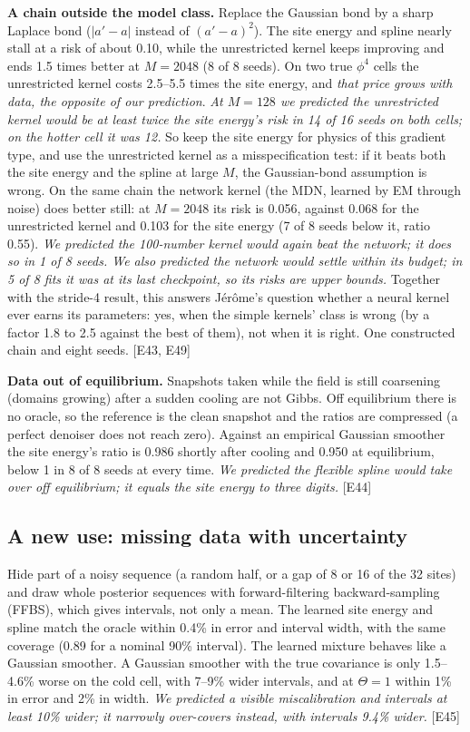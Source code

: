 \documentclass[11pt,a4paper]{article}
\newcommand{\src}[1]{{\footnotesize\color{gray}[#1]}}
\newcommand{\fals}[1]{{\small\itshape #1}}
\begin{document}
\textbf{A chain outside the model class.} Replace the Gaussian bond by a sharp Laplace bond ($|a'-a|$ instead of $(a'-a)^2$). The
site energy and spline nearly stall at a risk of about 0.10, while the unrestricted kernel keeps improving and ends 1.5 times better
at $M=2048$ (8 of 8 seeds). On two true $\phi^4$ cells the unrestricted kernel costs 2.5--5.5 times the site energy, and
\fals{that price grows with data, the opposite of our prediction}. \fals{At $M=128$ we predicted the unrestricted kernel would be at least twice the site energy's risk in 14 of 16 seeds on both cells;
on the hotter cell it was 12.} So keep the site energy for physics of this gradient type, and use the
unrestricted kernel as a misspecification test: if it beats both the site energy and the spline at large $M$, the Gaussian-bond
assumption is wrong. On the same chain the network kernel (the MDN, learned by EM through noise) does better still: at $M=2048$ its risk is
0.056, against 0.068 for the unrestricted kernel and 0.103 for the site energy (7 of 8 seeds below it, ratio 0.55). \fals{We predicted
the 100-number kernel would again beat the network; it does so in 1 of 8 seeds. We also predicted the network would settle within its
budget; in 5 of 8 fits it was at its last checkpoint, so its risks are upper bounds.} Together with the stride-4 result, this answers
Jérôme's question whether a neural kernel ever earns its parameters: yes, when the simple kernels' class is wrong (by a factor 1.8 to
2.5 against the best of them), not when it is right. One constructed chain and eight seeds. \src{E43, E49}

\textbf{Data out of equilibrium.} Snapshots taken while the field is still coarsening (domains growing) after a sudden cooling are not
Gibbs. Off equilibrium there is no oracle, so the reference is the clean snapshot and the ratios are compressed (a perfect denoiser
does not reach zero). Against an empirical Gaussian smoother the site energy's ratio is 0.986 shortly after cooling and 0.950 at
equilibrium, below 1 in 8 of 8 seeds at every time. \fals{We predicted the flexible spline would take over off equilibrium; it
equals the site energy to three digits.} \src{E44}

\subsection{A new use: missing data with uncertainty}

Hide part of a noisy sequence (a random half, or a gap of 8 or 16 of the 32 sites) and draw whole posterior sequences with
forward-filtering backward-sampling (FFBS), which gives intervals, not only a mean. The learned site energy and spline match the oracle
within 0.4\% in error and interval width, with the same coverage (0.89 for a nominal 90\% interval). The learned mixture behaves like
a Gaussian smoother. A Gaussian smoother with the true covariance is only 1.5--4.6\% worse on the cold cell, with 7--9\% wider
intervals, and at $\Theta=1$ within 1\% in error and 2\% in width. \fals{We predicted a visible miscalibration and intervals at least 10\% wider; it
narrowly over-covers instead, with intervals 9.4\% wider.} \src{E45}
\end{document}
